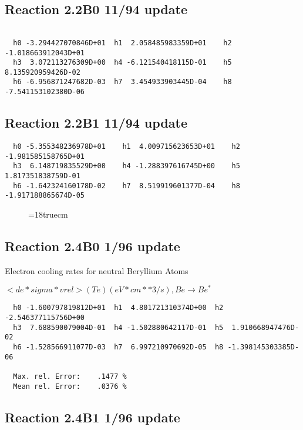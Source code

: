 \subsection{
Reaction 2.2B0                    11/94 update
}

\begin{verbatim}

  h0 -3.294427070846D+01  h1  2.058485983359D+01    h2 -1.018663912043D+01
  h3  3.072113276309D+00  h4 -6.121540418115D-01    h5  8.135920959426D-02
  h6 -6.956871247682D-03  h7  3.454933903445D-04    h8 -7.541153102380D-06
\end{verbatim}

\subsection{
Reaction 2.2B1                    11/94 update
}


\begin{verbatim}
  h0 -5.355348236978D+01    h1  4.009715623653D+01    h2 -1.981585158765D+01
  h3  6.148719835529D+00    h4 -1.288397616745D+00    h5  1.817351838759D-01
  h6 -1.642324160178D-02    h7  8.519919601377D-04    h8 -1.917188865674D-05
\end{verbatim}

\begin{figure} \label{e2.2B}
\epsfxsize=18truecm
\end{figure}
\newpage

\subsection{
Reaction 2.4B0                     1/96 update
}

  Electron cooling rates for neutral
  Beryllium Atoms

 $<de*sigma*vrel>(Te)  (eV*cm**3/s), Be  \rightarrow Be^*$

\begin{verbatim}
  h0 -1.600797819812D+01  h1  4.801721310374D+00  h2 -2.546377115756D+00
  h3  7.688590079004D-01  h4 -1.502880642117D-01  h5  1.910668947476D-02
  h6 -1.528566911077D-03  h7  6.997210970692D-05  h8 -1.398145303385D-06

  Max. rel. Error:    .1477 %
  Mean rel. Error:    .0376 %

\end{verbatim}


\subsection{
Reaction 2.4B1                     1/96 update
}

